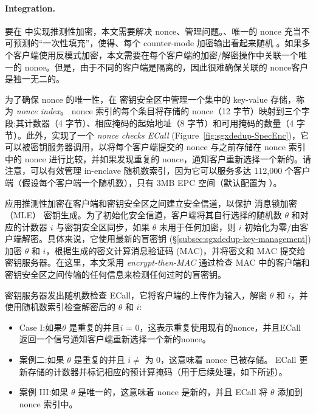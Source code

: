 \paragraph*{Integration.} 要在 \sysnameS 中实现推测性加密，本文需要解决 nonce、管理问题。、唯一的 nonce 充当不可预测的“一次性填充”，使得、每个 counter-mode 加密输出看起来随机 \cite{counter}。如果多个客户端使用反模式加密，本文需要在每个客户端的加密/解密操作中关联一个唯一的 nonce。但是，由于不同的客户端是隔离的，因此很难确保关联的 nonce客户是独一无二的。

为了确保 nonce 的唯一性，\sysnameS 在 密钥安全区中管理一个集中的 key-value 存储，称为 \textit{ nonce index}。 nonce 索引的每个条目将存储的 nonce（12 字节）映射到三个字段:其计数器（4 字节）、相应掩码的起始地址（8 字节）和可用掩码的数量（4 字节）。此外，\sysnameS 实现了一个 \textit{ nonce checks ECall} (Figure~\ref{fig:sgxdedup-SpecEnc})，它可以被密钥服务器调用，以将每个客户端提交的 nonce 与之前存储在 nonce 索引中的 nonce 进行比较，并如果发现重复的 nonce，通知客户重新选择一个新的。请注意，可以有效管理 in-enclave 随机数索引，因为它可以服务多达 112,000 个客户端（假设每个客户端一个随机数），只有 3MB EPC 空间（默认配置为 \sysnameS）。

\sysnameS 应用推测性加密在客户端和密钥安全区之间建立安全信道，以保护 消息锁加密（MLE） 密钥生成。为了初始化安全信道，客户端将其自行选择的随机数 $\theta$ 和对应的计数器 $i$ 与密钥安全区同步，如果 $\theta$ 未用于任何加密，则 $i$ 初始化为零/由客户端解密。具体来说，它使用最新的盲密钥 (\S\ref{subsec:sgxdedup-key-management}) 加密 $\theta$ 和 $i$，根据生成的密文计算消息验证码 (MAC)，并将密文和 MAC 提交给密钥服务器。在这里，本文采用 \textit{ encrypt-then-MAC} \cite{bellare2000Authenticated} 通过检查 MAC 中的客户端和密钥安全区之间传输的任何信息来检测任何过时的盲密钥。

密钥服务器发出随机数检查 ECall，它将客户端的上传作为输入，解密 $\theta$ 和 $i$，并使用随机数索引检查解密后的 $\theta$ 和 $i$:
%
\begin{itemize}[leftmargin=*]
\item Case I:如果$\theta$ 是重复的并且$i$ = 0，这表示重复使用现有的nonce，并且ECall 返回一个信号通知客户端重新选择一个新的nonce。
\item 案例二:如果 $\theta$ 是重复的并且 $i \neq$ 为 0，这意味着 nonce 已被存储。 ECall 更新存储的计数器并标记相应的预计算掩码（用于后续处理，如下所述）。
\item 案例 III:如果 $\theta$ 是唯一的，这意味着 nonce 是新的，并且 ECall 将 $\theta$ 添加到 nonce 索引中。
\end{itemize}

